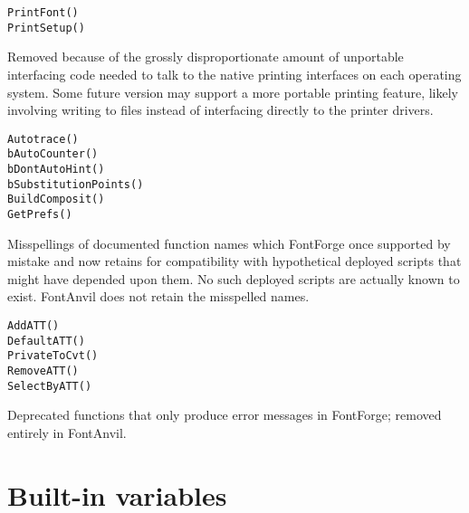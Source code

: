 \noindent
\texttt{PrintFont()}\FFdiff\\
\texttt{PrintSetup()}

Removed because of the grossly disproportionate amount of unportable
interfacing code needed to talk to the native printing interfaces on each
operating system.  Some future version may support a more portable printing
feature, likely involving writing to files instead of interfacing directly
to the printer drivers.

\noindent
\texttt{Autotrace()}\FFdiff\\
\texttt{bAutoCounter()}\\
\texttt{bDontAutoHint()}\\
\texttt{bSubstitutionPoints()}\\
\texttt{BuildComposit()}\\
\texttt{GetPrefs()}

Misspellings of documented function names which FontForge once supported by
mistake and now retains for compatibility with hypothetical deployed
scripts that might have depended upon them.  No such deployed scripts are
actually known to exist.  FontAnvil does not retain the misspelled names.

\noindent
\texttt{AddATT()}\FFdiff\\
\texttt{DefaultATT()}\\
\texttt{PrivateToCvt()}\\
\texttt{RemoveATT()}\\
\texttt{SelectByATT()}

Deprecated functions that only produce error messages in FontForge; removed
entirely in FontAnvil.


\section{Built-in variables}

